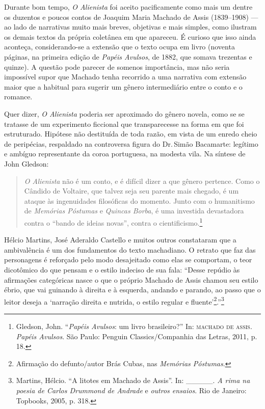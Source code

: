 Durante bom tempo, \emph{O Alienista} foi aceito pacificamente como mais
um dentre os duzentos e poucos contos de Joaquim Maria Machado de Assis
(1839--1908) --- ao lado de narrativas muito mais breves, objetivas e mais
simples, como ilustram os demais textos da própria coletânea em que
apareceu. É curioso que isso ainda aconteça, considerando-se a extensão
que o texto ocupa em livro (noventa páginas, na primeira edição de
\emph{Papéis Avulsos}, de 1882, que somava trezentas e quinze). A
questão pode parecer de somenos importância, mas não seria impossível
supor que Machado tenha recorrido a uma narrativa com extensão maior que
a habitual para sugerir um gênero intermediário entre o conto e o
romance.

Quer dizer, \emph{O Alienista} poderia ser aproximado do gênero novela,
como se se tratasse de um experimento ficcional que transparecesse na
forma em que foi estruturado. Hipótese não destituída de toda razão, em
vista de um enredo cheio de peripécias, respaldado na controversa figura
do Dr.\,Simão Bacamarte: legítimo e ambíguo representante da coroa
portuguesa, na modesta vila. Na síntese de John Gledson:

\begin{quote}
\emph{O Alienista} não é um conto, e é difícil dizer a que gênero
pertence. Como o Cândido de Voltaire, que talvez seja seu parente mais
chegado, é um ataque às ingenuidades filosóficas do momento. Junto com o
humanitismo de \emph{Memórias Póstumas} e \emph{Quincas Borba}, é uma
investida devastadora contra o ``bando de ideias novas'', contra o
cientificismo.\footnote{Gledson, John. ``\emph{Papéis Avulsos}: um livro
  brasileiro?'' In: \textsc{machado de assis}. \emph{Papéis Avulsos}. São Paulo:
  Penguin Classics/Companhia das Letras, 2011, p. 18.}
\end{quote}

Hélcio Martins, José Aderaldo Castello e muitos outros constataram que a
ambivalência é um dos fundamentos do texto machadiano. O retrato que faz
das personagens é reforçado pelo modo desajeitado como elas se
comportam, o teor dicotômico do que pensam e o estilo indeciso de sua
fala: ``Desse repúdio às afirmações categóricas nasce o que o próprio
Machado de Assis chamou seu estilo ébrio, que vai guinando à direita e à
esquerda, andando e parando, ao passo que o leitor deseja a `narração
direita e nutrida, o estilo regular e fluente'\footnote{Afirmação do
  defunto/autor Brás Cubas, nas \emph{Memórias Póstumas}.}.''\footnote{Martins,
  Hélcio. ``A litotes em Machado de Assis''. In: \_\_\_\_\_. \emph{A
  rima na poesia de Carlos Drummond de Andrade} e \emph{outros ensaios}.
  Rio de Janeiro: Topbooks, 2005, p. 318.}

